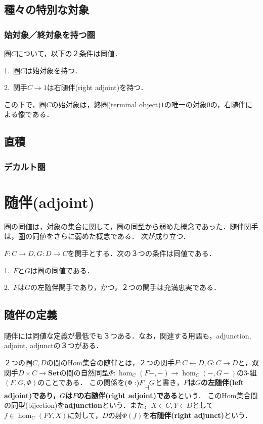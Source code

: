 \documentclass[uplatex, 12pt, dvipdfmx]{jsreport}
\begin{document}
\section{種々の特別な対象}

\subsection{始対象／終対象を持つ圏}

\begin{proposition}[始対象を持つ圏の特徴付け]\rm{}
    圏$C$について，以下の２条件は同値．
    
    1.\, 圏$C$は始対象を持つ．

    2.\, 関手$C\to 1$は右随伴(right adjoint)を持つ．
\end{proposition}
この下で，圏$C$の始対象は，終圏(terminal object)$1$の唯一の対象$0$の，右随伴による像である．

\section{直積}

\subsection{デカルト圏}

\chapter{随伴(adjoint)}
圏の同値は，対象の集合に関して，圏の同型から弱めた概念であった．随伴関手は，圏の同値をさらに弱めた概念である．
次が成り立つ．
\begin{proposition}
    $F:C\to D, G:D\to C$を関手とする．次の３つの条件は同値である．\rm{}

    1.\, $F$と$G$は圏の同値である．

    2.\, $F$は$G$の左随伴関手であり，かつ，２つの関手は充満忠実である．
\end{proposition}

\section{随伴の定義}
随伴には同値な定義が最低でも３つある．なお，関連する用語も，adjunction, adjoint, adjunctの３つがある．

\begin{definition}[Hom集合随伴としての定義]\rm{}
    ２つの圏$C,D$の間のHom集合の随伴とは，２つの関手$F:C\leftarrow D, G:C\rightarrow D$と，双関手$D\times C\to\mathbf{Set}$の間の自然同型$\Phi :\hom_C(F-,-)\to\hom_C(-,G-)$の3-組$(F,G,\Phi)$のことである．
    この関係を$(\Phi :)F\rotatebox{180}{$\vdash$}G$と書き，\textbf{$F$は$G$の左随伴(left adjoint)であり，$G$は$F$の右随伴(right adjoint)である}という．
    このHom集合間の同型(bijection)を\textbf{adjunction}という．また，$X\in C, Y\in D$として$f\in\hom_C(FY,X)$に対して，$D$の射$\Phi (f)$を\textbf{右随伴(right adjunct)}という．
\end{definition}
\end{document}
